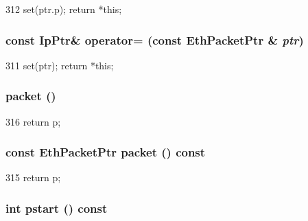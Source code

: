 \begin{DoxyCode}
312 { set(ptr.p); return *this; }
\end{DoxyCode}
\hypertarget{classNet_1_1IpPtr_a373856ac40644c22335b0b137e2a9bb4}{
\subsubsection[{operator=}]{\setlength{\rightskip}{0pt plus 5cm}const {\bf IpPtr}\& operator= (const {\bf EthPacketPtr} \& {\em ptr})}}
\label{classNet_1_1IpPtr_a373856ac40644c22335b0b137e2a9bb4}



\begin{DoxyCode}
311 { set(ptr); return *this; }
\end{DoxyCode}
\hypertarget{classNet_1_1IpPtr_a549ac5c293e8047f1be38ca356e160da}{
\subsubsection[{packet}]{ packet ()}}
\label{classNet_1_1IpPtr_a549ac5c293e8047f1be38ca356e160da}



\begin{DoxyCode}
316 { return p; }
\end{DoxyCode}
\hypertarget{classNet_1_1IpPtr_a13e32a6fa7b2f1b41d1d8dc32d8fda9e}{
\subsubsection[{packet}]{\setlength{\rightskip}{0pt plus 5cm}const {\bf EthPacketPtr} packet () const}}
\label{classNet_1_1IpPtr_a13e32a6fa7b2f1b41d1d8dc32d8fda9e}



\begin{DoxyCode}
315 { return p; }
\end{DoxyCode}
\hypertarget{classNet_1_1IpPtr_ae6fc8073bc02ff3fd03030e0936d56eb}{
\subsubsection[{pstart}]{\setlength{\rightskip}{0pt plus 5cm}int pstart () const}}
\label{classNet_1_1IpPtr_ae6fc8073bc02ff3fd03030e0936d56eb}



